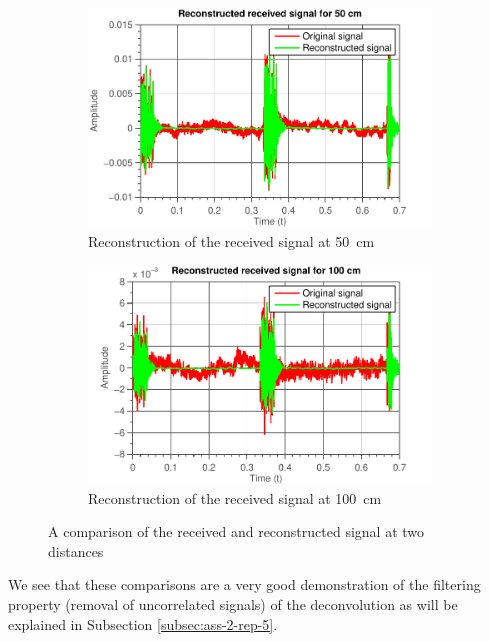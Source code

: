 \documentclass[11pt,titlepage]{report}
\begin{document}
\begin{figure}[H]
	\centering
	\begin{subfigure}{0.49\textwidth}
		\includegraphics[width=\textwidth]{../../deliverable-7-resources/figures/ass-1/report-14-15/ass-1-report-14-50cm-reconstruction.pdf}
		\caption{\centering Reconstruction of the received signal at \SI{50}{cm}}
	\end{subfigure}
	\begin{subfigure}{0.49\textwidth}
		\includegraphics[width=\textwidth]{../../deliverable-7-resources/figures/ass-1/report-14-15/ass-1-report-14-100cm-reconstruction.pdf}
		\caption{\centering Reconstruction of the received signal at \SI{100}{cm}}
	\end{subfigure}
	\caption{A comparison of the received and reconstructed signal at two distances}
	\label{fig:ass-1-rep-14-comp}
\end{figure}

We see that these comparisons are a very good demonstration of the filtering property (removal of uncorrelated signals) of the deconvolution as will be explained in Subsection \ref{subsec:ass-2-rep-5}.
\end{document}
